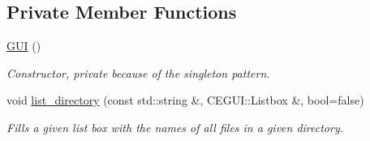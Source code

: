 \subsection*{Private Member Functions}
\begin{DoxyCompactItemize}
\item 
\hyperlink{class_g_u_i_a8cbb3140b7d3c9d8e942d6ce6b60a0e8}{G\+UI} ()
\begin{DoxyCompactList}\small\item\em Constructor, private because of the singleton pattern. \end{DoxyCompactList}\item 
void \hyperlink{class_g_u_i_a457e1e62289a5da4eef425cb526d0e5b}{list\+\_\+directory} (const std\+::string \&, C\+E\+G\+U\+I\+::\+Listbox \&, bool=false)
\begin{DoxyCompactList}\small\item\em Fills a given list box with the names of all files in a given directory. \end{DoxyCompactList}\end{DoxyCompactItemize}
